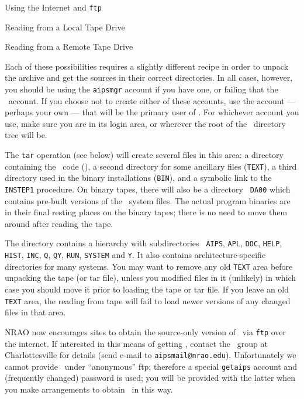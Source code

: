 \item\bul Using the Internet and {\tt ftp}
\item\bul Reading from a Local Tape Drive
\item\bul Reading from a Remote Tape Drive
\medskip

\noindent Each of these possibilities requires a slightly different
recipe in order to unpack the archive and get the sources in their correct
directories.  In all cases, however, you should be using the {\tt aipsmgr}
account if you have one, or failing that the \ttaips\ account.  If you
choose not to create either of these accounts, use the account --- perhaps
your own --- that will be the primary user of \AIPS.  For whichever
account you use, make sure you are in its login area, or wherever the root
of the \ttaips\ directory tree will be.

The {\tt tar} operation (see below) will create several files in this
area: a directory containing the \AIPS\ code ({\tt\thisver}), a second
directory for some ancillary files ({\tt TEXT}), a third directory used in
the binary installations ({\tt BIN}), and a symbolic link to the {\tt
INSTEP1} procedure.  On binary tapes, there will also be a directory {\tt
DA00} which contains pre-built versions of the \AIPS\ system files.  The
actual program binaries are in their final resting places on the binary
tapes; there is no need to move them around after reading the tape.

The {\tt\thisver} directory contains a hierarchy with subdirectories {\tt
AIPS}, {\tt APL}, {\tt DOC}, {\tt HELP}, {\tt HIST}, {\tt INC}, {\tt Q},
{\tt QY}, {\tt RUN}, {\tt SYSTEM} and {\tt Y}.  It also contains
architecture-specific directories for many systems.  You may want to
remove any old {\tt TEXT} area before unpacking the tape (or tar file),
unless you modified files in it (unlikely) in which case you should move
it prior to loading the tape or tar file.  If you leave an old {\tt TEXT}
area, the reading from tape will fail to load newer versions of any
changed files in that area.

\medskip{}

NRAO now encourages sites to obtain the source-only version of \AIPS\ via
{\tt ftp} over the internet.  If interested in this means of getting
\AIPS, contact the \AIPS\ group at Charlottesville for details (send
e-mail to {\tt aipsmail@nrao.edu}).  Unfortunately we cannot provide
\AIPS\ under ``anonymous'' ftp; therefore a special {\tt getaips} account
and (frequently changed) password is used; you will be provided with the
latter when you make arrangements to obtain \AIPS\ in this way.

